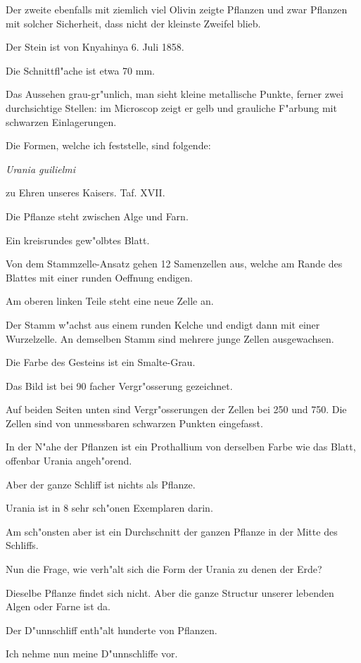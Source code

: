 \documentclass[a4paper, 11pt, oneside, german]{article}
\begin{document}
Der zweite ebenfalls mit ziemlich viel Olivin zeigte Pflanzen und zwar Pflanzen mit solcher Sicherheit, dass nicht der kleinste Zweifel blieb.

Der Stein ist von Knyahinya 6. Juli 1858.

Die Schnittfl"ache ist etwa 70 mm.

Das Aussehen grau-gr"unlich, man sieht kleine metallische Punkte, ferner zwei durchsichtige Stellen: im Microscop zeigt er gelb und grauliche F"arbung mit schwarzen Einlagerungen.

Die Formen, welche ich feststelle, sind folgende:

\emph{Urania guilielmi}

zu Ehren unseres Kaisers. Taf. XVII.

Die Pflanze steht zwischen Alge und Farn.

Ein kreisrundes gew"olbtes Blatt.

Von dem Stammzelle-Ansatz gehen 12 Samenzellen aus, welche am Rande des Blattes mit einer runden Oeffnung endigen.

Am oberen linken Teile steht eine neue Zelle an.

Der Stamm w"achst aus einem runden Kelche und endigt dann mit einer Wurzelzelle. An demselben Stamm sind mehrere junge Zellen ausgewachsen.

Die Farbe des Gesteins ist ein Smalte-Grau.

Das Bild ist bei 90 facher Vergr"osserung gezeichnet.

Auf beiden Seiten unten sind Vergr"osserungen der Zellen bei 250 und 750. Die Zellen sind von unmessbaren schwarzen Punkten eingefasst.

In der N"ahe der Pflanzen ist ein Prothallium von derselben Farbe wie das Blatt, offenbar Urania angeh"orend.

Aber der ganze Schliff ist nichts als Pflanze.

Urania ist in 8 sehr sch"onen Exemplaren darin.

Am sch"onsten aber ist ein Durchschnitt der ganzen Pflanze in der Mitte des Schliffs.

Nun die Frage, wie verh"alt sich die Form der Urania zu denen der Erde?

Dieselbe Pflanze findet sich nicht. Aber die ganze Structur unserer lebenden Algen oder Farne ist da.

Der D"unnschliff enth"alt hunderte von Pflanzen.

Ich nehme nun meine D"unnschliffe vor.
\end{document}
